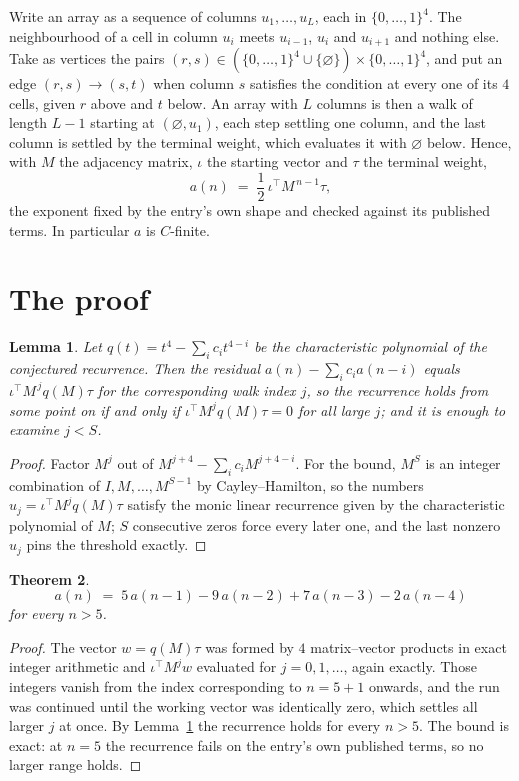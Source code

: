 \documentclass[11pt,a4paper]{article}
\theoremstyle{plain}
\newtheorem{theorem}{Theorem}
\newtheorem{lemma}[theorem]{Lemma}
\theoremstyle{definition}
\begin{document}
Write an array as a sequence of columns $u_1,\dots,u_L$, each in
$\{0,\dots,1\}^{4}$. The neighbourhood of a cell in column $u_i$ meets $u_{i-1}$,
$u_i$ and $u_{i+1}$ and nothing else. Take as vertices the pairs
$(r,s)\in(\{0,\dots,1\}^{4}\cup\{\varnothing\})\times\{0,\dots,1\}^{4}$,
and put an edge $(r,s)\to(s,t)$ when column $s$ satisfies the condition at every one of its
$4$ cells, given $r$ above and $t$ below. An array with $L$ columns is then a walk of length
$L-1$ starting at $(\varnothing,u_1)$, each step settling one column, and the last column is
settled by the terminal weight, which evaluates it with $\varnothing$ below. Hence,
with $M$ the adjacency matrix, $\iota$ the starting vector and $\tau$ the terminal weight,
\[
a(n)\;=\;\frac{1}{2}\,\iota^{\!\top}M^{\,n-1}\tau ,
\]
the exponent fixed by the entry's own shape and checked against its published terms. In
particular $a$ is $C$-finite.

\section{The proof}

\begin{lemma}\label{lem:crit}
Let $q(t)=t^{4}-\sum_i c_it^{4-i}$ be the characteristic polynomial of the
conjectured recurrence. Then the residual $a(n)-\sum_ic_ia(n-i)$ equals
$\iota^{\!\top}M^{\,j}q(M)\tau$ for the corresponding walk index $j$, so the
recurrence holds from some point on if and only if $\iota^{\!\top}M^{j}q(M)\tau=0$ for all
large $j$; and it is enough to examine $j<S$.
\end{lemma}

\begin{proof}
Factor $M^{j}$ out of $M^{j+4}-\sum_ic_iM^{j+4-i}$. For the bound, $M^{S}$
is an integer combination of $I,M,\dots,M^{S-1}$ by Cayley--Hamilton, so the numbers
$u_j=\iota^{\!\top}M^{j}q(M)\tau$ satisfy the monic linear recurrence given by the
characteristic polynomial of $M$; $S$ consecutive zeros force every later one, and the last
nonzero $u_j$ pins the threshold exactly.
\end{proof}

\begin{theorem}
\[
a(n)\;=\;5\,a(n-1) - 9\,a(n-2) + 7\,a(n-3) - 2\,a(n-4)
\]
for every $n>5$.
\end{theorem}

\begin{proof}
The vector $w=q(M)\tau$ was formed by $4$ matrix--vector products in exact integer
arithmetic and $\iota^{\!\top}M^{j}w$ evaluated for $j=0,1,\dots$, again exactly. Those
integers vanish from the index corresponding to $n=5+1$ onwards, and the run was
continued until the working vector was identically zero, which settles all larger $j$ at once.
By Lemma~\ref{lem:crit} the recurrence holds for every $n>5$. The bound is exact: at $n=5$ the recurrence fails on the entry's own published terms, so no larger range holds.
\end{proof}
\end{document}
